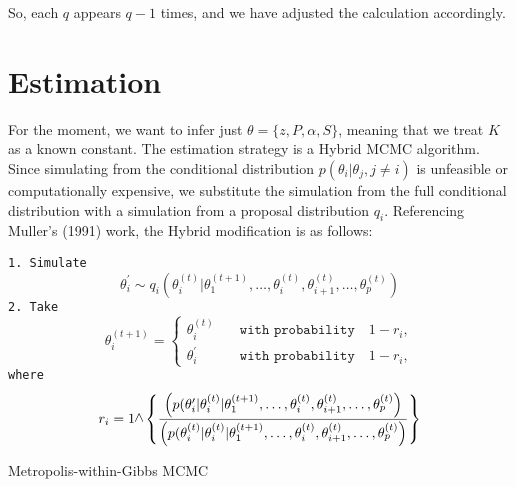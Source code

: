 \documentclass[11pt]{amsart}
\newcommand{\vertg}{\rotatebox{90}{$>$}}
\begin{document}
So, each $q$ appears $q-1$ times, and we have adjusted the calculation accordingly.





\section{Estimation}

For the moment, we want to infer just $\theta = \{ z, P, \alpha, S \}$, meaning that we treat $K$ as a known constant. The estimation strategy is a Hybrid MCMC algorithm. Since simulating from the conditional distribution $p(\theta_i| \theta_j, j\neq i)$ is unfeasible or computationally expensive, we substitute the simulation from the full conditional distribution with a simulation from a proposal distribution $q_i$. Referencing Muller's (1991) work, the Hybrid modification is as follows:

\begin{algorithm}
\begin{algorithmic}[h]
\State \texttt{1. Simulate} \begin{equation}\label{eqn_general_proposal}
\theta_i^{\prime} \sim q_i \left(\theta_i^{(t)} | \theta_1^{(t+1)}, \dots,\theta_{i}^{(t)},\theta_{i+1}^{(t)}, \dots,\theta_{p}^{(t)} \right)
\end{equation}
\State \texttt{2. Take} \begin{equation}\label{eqn_acc_reject}
\theta_i^{(t+1)} = 
\begin{cases}
\theta_{i}^{(t)} \quad &\texttt{with probability} \quad 1 - r_i, \\
\theta_{i}^{\prime} \quad &\texttt{with probability} \quad 1 - r_i,
\end{cases}
\end{equation}
\State \texttt{where} \begin{equation}\label{eqn_gen_ratio}
r_i = 1 \vertg \left\{
\frac{\left(p(\theta_i^{\prime}|\theta_i^{(t)} | \theta_1^{(t+1)}, \dots,\theta_{i}^{(t)},\theta_{i+1}^{(t)}, \dots,\theta_{p}^{(t)}\right)}{\left(p(\theta_i^{(t)}|\theta_i^{(t)} | \theta_1^{(t+1)}, \dots,\theta_{i}^{(t)},\theta_{i+1}^{(t)}, \dots,\theta_{p}^{(t)}\right)}\right\}
\end{equation}
\EndFor
\end{algorithmic}
\label{alg_general_algortm}
\caption{Metropolis-within-Gibbs MCMC}
\end{algorithm}
\end{document}
